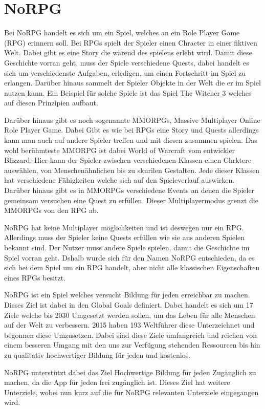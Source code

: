 \chapter{NoRPG}
Bei NoRPG handelt es sich um ein Spiel, welches an ein Role Player Game (RPG) erinnern soll. Bei RPGs spielt der Spieler einen Chracter in einer fiktiven Welt. Dabei gibt es eine Story die wärend des spielens erlebt wird. Damit diese Geschichte vorran geht, muss der Spiele verschiedene Quests, dabei handelt es sich um verschiedenste Aufgaben, erledigen, um einen Fortschritt im Spiel zu erlangen. Darüber hinaus sammelt der Spieler Objekte in der Welt die er im Spiel nutzen kann. Ein Beispiel für solche Spiele ist das Spiel The Witcher 3 welches auf diesen Prinzipien aufbaut. 
	
Darüber hinaus gibt es noch sogenannte MMORPGs, Massive Multiplayer Online Role Player Game. Dabei Gibt es wie bei RPGs eine Story und Quests allerdings kann man auch auf andere Spieler treffen und mit diesen zusammen spielen. Das wohl berühmteste MMORPG ist dabei World of Warcraft vom entwickler Blizzard. Hier kann der Spieler zwischen verschiedenen Klassen einen Chrktere auswählen, von Menschenähnlichen bis zu skurilen Gestalten. Jede dieser Klassen hat verschiedene Fähigkeiten welche sich auf den Spieleverlauf auswirken. Darüber hinaus gibt es in MMORPGs verschiedene Events an denen die Spieler gemeinsam versuchen eine Quest zu erfüllen. Dieser Multiplayermodus grenzt die MMORPGs von den RPG ab.

NoRPG hat keine Multiplayer möglichkeiten und ist deswegen nur ein RPG. Allerdings muss der Spieler keine Quests erfüllen wie sie aus anderen Spielen bekannt sind. Der Nutzer muss andere Spiele spielen, damit die Geschichte im Spiel vorran geht. Dshalb wurde sich für den Namen NoRPG entschieden, da es sich bei dem Spiel um ein RPG handelt, aber nicht alle klassischen Eigenschaften eines RPGs besitzt.
	
NoRPG ist ein Spiel welches versucht Bildung für jeden erreichbar zu machen. Dieses Ziel ist dabei in den Global Goals definiert. Dabei handelt es sich um 17 Ziele welche bis 2030 Umgesetzt werden sollen, um das Leben für alle Menschen auf der Welt zu verbessern. 2015 haben 193 Weltführer diese Unterzeichnet und begonnen diese Umzusetzen. Dabei sind diese Ziele umfangreich und reichen von einem besseren Umgang mit den uns zur Verfügung stehenden Ressourcen bis hin zu qualitativ hochwertiger Bildung für jeden und kostenlos.

NoRPG unterstützt dabei das Ziel Hochwertige Bildung für jeden Zugänglich zu machen, da die App für jeden frei zugänglich ist. Dieses Ziel hat weitere Unterziele, wobei nun kurz auf die für NoRPG relevanten Unterziele eingegangen wird.

